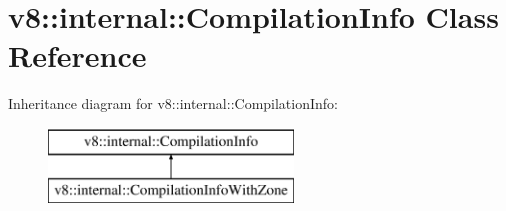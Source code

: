 \hypertarget{classv8_1_1internal_1_1_compilation_info}{}\section{v8\+:\+:internal\+:\+:Compilation\+Info Class Reference}
\label{classv8_1_1internal_1_1_compilation_info}
Inheritance diagram for v8\+:\+:internal\+:\+:Compilation\+Info\+:\begin{figure}[H]
\begin{center}
\leavevmode
\includegraphics[height=2.000000cm]{classv8_1_1internal_1_1_compilation_info}
\end{center}
\end{figure}
